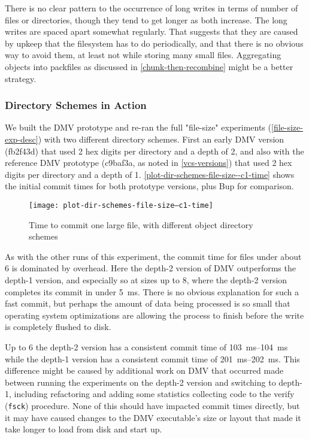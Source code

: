 There is no clear pattern to the occurrence of long writes in terms of number of
files or directories, though they tend to get longer as both increase. The long
writes are spaced apart somewhat regularly. That suggests that they are caused
by upkeep that the filesystem has to do periodically, and that there is no
obvious way to avoid them, at least not while storing many small files.
Aggregating objects into \glspl{packfile} as discussed in
\autoref{chunk-then-recombine} might be a better strategy.


\subsubsection{Directory Schemes in Action}

We built the DMV prototype and re-ran the full "file-size" experiments
(\autoref{file-size-exp-desc}) with two different directory schemes. First an
early DMV version (fb2f43d) that used \num{2} hex digits per directory and a
depth of \num{2}, and also with the reference DMV prototype (c9baf3a, as noted
in \autoref{vcs-versions}) that used \num{2} hex digits per directory and a
depth of \num{1}. \autoref{plot-dir-schemes-file-size--c1-time} shows the
initial commit times for both prototype versions, plus Bup for comparison.

\begin{figure}
    \caption{Time to commit one large file, with different object directory
    schemes}
    \label{plot-dir-schemes-file-size--c1-time}
    \centering

    \explainlogsubfig

    \texttt{[image: plot-dir-schemes-file-size--c1-time]}
\end{figure}

As with the other runs of this experiment, the commit time for files under about
\SI{6}{\mib} is dominated by overhead. Here the depth-\num{2} version of DMV
outperforms the depth-\num{1} version, and especially so at sizes up to
\SI{8}{\kib}, where the depth-\num{2} version completes its commit in under
\SI{5}{\ms}. There is no obvious explanation for such a fast commit, but perhaps
the amount of data being processed is so small that operating system
optimizations are allowing the process to finish before the write is completely
flushed to disk.

Up to \SI{6}{\mib} the depth-\num{2} version has a consistent commit time of
\SIrange{103}{104}{\ms} while the depth-\num{1} version has a consistent commit
time of \SIrange{201}{202}{\ms}. This difference might be caused by additional
work on DMV that occurred made between running the experiments on the
depth-\num{2} version and switching to depth-\num{1}, including refactoring and
adding some statistics collecting code to the verify (\lstinline{fsck})
procedure. None of this should have impacted commit times directly, but it may
have caused changes to the DMV executable's size or layout that made it take
longer to load from disk and start up.

